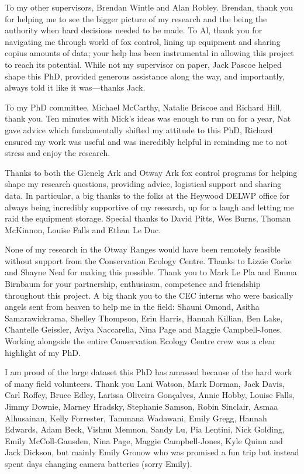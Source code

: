 \documentclass[11pt,a4paper,titlepage,twoside,openright]{style/unimelbthesis}
\begin{document}
\begin{frontmatter}
\begin{acknowledgements}
    To my other supervisors, Brendan Wintle and Alan Robley. Brendan, thank you for helping me to see the bigger picture of my research and the being the authority when hard decisions needed to be made. To Al, thank you for navigating me through world of fox control, lining up equipment and sharing copius amounts of data; your help has been instrumental in allowing this project to reach its potential. While not my supervisor on paper, Jack Pascoe helped shape this PhD, provided generous assistance along the way, and importantly, always told it like it was---thanks Jack.
    
    To my PhD committee, Michael McCarthy, Natalie Briscoe and Richard Hill, thank you. Ten minutes with Mick's ideas was enough to run on for a year, Nat gave advice which fundamentally shifted my attitude to this PhD, Richard ensured my work was useful and was incredibly helpful in reminding me to not stress and enjoy the research.
    
    Thanks to both the Glenelg Ark and Otway Ark fox control programs for helping shape my research questions, providing advice, logistical support and sharing data. In particular, a big thanks to the folks at the Heywood DELWP office for always being incredibly supportive of my research, up for a laugh and letting me raid the equipment storage. Special thanks to David Pitts, Wes Burns, Thoman McKinnon, Louise Falls and Ethan Le Duc.
    
    None of my research in the Otway Ranges would have been remotely feasible without support from the Conservation Ecology Centre. Thanks to Lizzie Corke and Shayne Neal for making this possible. Thank you to Mark Le Pla and Emma Birnbaum for your partnership, enthusiasm, competence and friendship throughout this project. A big thank you to the CEC interns who were basically angels sent from heaven to help me in the field: Shauni Omond, Asitha Samarawickrama, Shelley Thompson, Erin Harris, Hannah Killian, Ben Lake, Chantelle Geissler, Aviya Naccarella, Nina Page and Maggie Campbell-Jones. Working alongside the entire Conservation Ecology Centre crew was a clear highlight of my PhD.
    
    I am proud of the large dataset this PhD has amassed because of the hard work of many field volunteers. Thank you Lani Watson, Mark Dorman, Jack Davis, Carl Roffey, Bruce Edley, Larissa Oliveira Gonçalves, Annie Hobby, Louise Falls, Jimmy Downie, Marney Hradsky, Stephanie Samson, Robin Sinclair, Asmaa Alhusainan, Kelly Forrester, Tammana Wadawani, Emily Gregg, Hannah Edwards, Adam Beck, Vishnu Memnon, Sandy Lu, Pia Lentini, Nick Golding, Emily McColl-Gausden, Nina Page, Maggie Campbell-Jones, Kyle Quinn and Jack Dickson, but mainly Emily Gronow who was promised a fun trip but instead spent days changing camera batteries (sorry Emily).
    

\end{acknowledgements}
\end{frontmatter}
\end{document}
